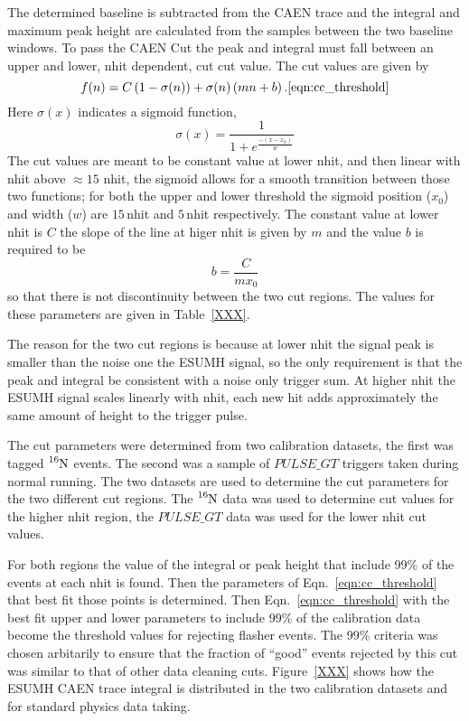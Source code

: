 The determined baseline is subtracted from the CAEN trace and the integral and maximum
peak height are calculated from the samples between the two baseline windows.
To pass the CAEN Cut the peak and integral must fall between an upper and lower, nhit dependent,
cut cut value.
The cut values are given by
\begin{equation}
    f(n) = C\left(1-\sigma(n)\right) + \sigma(n)\left(mn+b\right)\text{.}
    \ref{eqn:cc_threshold}
\end{equation}
Here $\sigma(x)$ indicates a sigmoid function,
\begin{equation}
    \sigma(x) = \frac{1}{1+e^{\frac{-(x-x_{0})}{w}}}
\end{equation}
The cut values are meant to be constant value at lower nhit, and then
linear with nhit above $\approx15$ nhit, the sigmoid allows for a smooth
transition between those two functions; for both the upper and lower threshold
the sigmoid position ($x_{0}$) and width ($w$) are $15$\,nhit and $5$\,nhit respectively.
The constant value at lower nhit is $C$ the slope of the line at higer nhit
is given by $m$ and the value $b$ is required to be
\begin{equation}
    b = \frac{C}{mx_{0}}
\end{equation}
so that there is not discontinuity between the two cut regions.
The values for these parameters are given in Table~\ref{XXX}.

The reason for the two cut regions is because at lower nhit the signal
peak is smaller than the noise one the ESUMH signal, so the only requirement
is that the peak and integral be consistent with a noise only trigger sum.
At higher nhit the ESUMH signal scales linearly with nhit, each new hit
adds approximately the same amount of height to the trigger pulse.

The cut parameters were determined from two calibration datasets, the first was
tagged $\ce{^{16}N}$
events. The second was a sample of $PULSE\_GT$ triggers taken during normal
running.
The two datasets are used to determine the cut parameters for the two
different cut regions.
The $\ce{^{16}N}$ data was used to determine cut values for the higher nhit
region, the $PULSE\_GT$ data was used for the lower nhit cut values.

For both regions the value of the integral or peak height that include
99\% of the events at each nhit is found. Then the parameters of
Eqn.~\ref{eqn:cc_threshold} that best fit those points is determined.
Then Eqn.~\ref{eqn:cc_threshold} with the best fit upper and lower
parameters to include 99\% of the calibration data become the threshold
values for rejecting flasher events.
The 99\% criteria was chosen arbitarily to ensure that the fraction of
``good'' events rejected by this cut was similar to that of other data
cleaning cuts.
Figure~\ref{XXX} shows how the ESUMH CAEN trace integral is distributed
in the two calibration datasets and for standard physics data taking.

